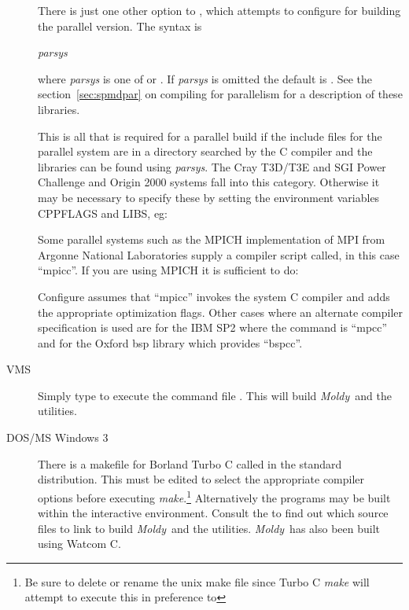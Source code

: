 \documentclass[a4paper,twoside]{report}
\newcommand{\moldy}{\emph{Moldy}}
\begin{document}
\begin{description}
There is just one other option to ,
 which attempts to configure for building the
parallel version.  The syntax is

\textit{parsys}

where \textit{parsys} is one of    or
.  If \textit{parsys} is omitted the default is .
See the section~\ref{sec:spmdpar} on compiling for parallelism for a
description of these libraries.

This is all that is required for a parallel build if the include files
for the parallel system are in a directory searched by the C compiler
and the libraries can be found using \textit{parsys}.  The
Cray T3D/T3E and SGI Power Challenge and Origin 2000 systems fall into
this category.  Otherwise it may be necessary to specify these by
setting the environment variables CPPFLAGS and LIBS, eg:


Some parallel systems such as the MPICH implementation of MPI
from Argonne National Laboratories supply a compiler script
called, in this case ``mpicc''.  If you are using MPICH it is
sufficient to do:


Configure assumes that ``mpicc'' invokes the system C compiler
and adds the appropriate optimization flags.  Other cases where
an alternate compiler specification is used are for the IBM SP2
where the command is ``mpcc'' and for the Oxford bsp library
which provides ``bspcc''.

\item[VMS]  Simply type  to execute the command file
. This will build \moldy\  and the utilities.

\item[DOS/MS Windows 3] There is a makefile for Borland Turbo C called
   in the standard distribution.  This must be
  edited to select the appropriate compiler options before executing
  \emph{make}.\footnote{Be sure to delete or rename the unix make file
     since Turbo C \emph{make} will attempt to
    execute this in preference to }
  Alternatively the programs may be built within the interactive
  environment.  Consult the  to find out which source
  files to link to build \moldy\ and the utilities.  \moldy\ has also
  been built using Watcom C.
  

\end{description}
\end{document}
